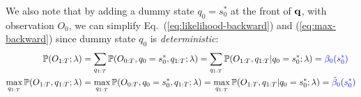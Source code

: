 We also note that by adding a dummy state $q_0 = s_0^*$ at the front of $\mathbf{q}$, with observation $O_0$, 
we can simplify Eq.~(\ref{eq:likelihood-backward}) and (\ref{eq:max-backward}) since dummy state $q_0$ is \emph{deterministic}:
\begin{align*}
\mathbb{P}(O_{1:T} ;\lambda) 
&= \sum_{q_{1:T}} \mathbb{P}(O_{0:T}, q_0 = s_0^*, q_{1:T}; \lambda)
 = \sum_{q_{1:T}} \mathbb{P}(O_{1:T}, q_{1:T} |q_0 = s_0^*; \lambda)
 = {\color{blue}{\beta_0(s_0^*)}} \\
\max_{q_{1:T}} \mathbb{P}(O_{1:T}, q_{1:T}; \lambda) 
&= \max_{q_{1:T}} \mathbb{P}(O_{0:T}, q_0 = s_0^*, q_{1:T}; \lambda)
 = \max_{q_{1:T}} \mathbb{P}(O_{1:T}, q_{1:T} |q_0 = s_0^*; \lambda)
 = {\color{blue}{\tilde{\beta}_0(s_0^*)}}
\end{align*}
